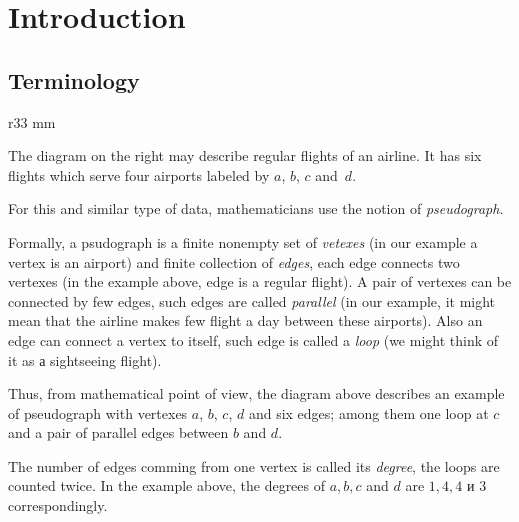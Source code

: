 \chapter{Introduction}
\section*{Terminology}

\begin{wrapfigure}{r}{33 mm}
\end{wrapfigure}

The diagram on the right may describe regular flights of an airline.
It has six flights which serve four airports labeled by $a$, $b$, $c$ and~$d$.

For this and similar type of data, mathematicians use the notion of \emph{pseudograph}.

Formally, a psudograph is a finite nonempty set of \emph{vetexes}  (in our example a vertex is an airport) 
and finite collection of \emph{edges}, each edge connects two vertexes (in the example above, edge is a regular flight).
A pair of vertexes can be connected by few edges, such edges are called \emph{parallel} (in our example, it might mean that the airline makes few  flight a day between these airports). 
Also an edge can connect a vertex to itself, such edge is called a \emph{loop} (we might think of it as а sightseeing flight).

Thus, from mathematical point of view, the diagram above describes an example of pseudograph with vertexes $a$, $b$, $c$, $d$ and 
six edges; among them one loop at $c$ and a pair of parallel edges between $b$ and $d$.

\smallskip

The number of edges comming from one vertex is called its \emph{degree}, the loops are counted twice.
In the example above,
the degrees of $a,b,c$ and $d$ are $1,4,4$ и $3$ correspondingly.

